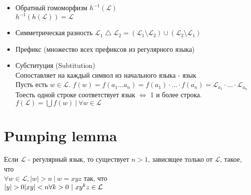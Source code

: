 \documentclass{article}
\begin{document}
\begin{itemize}
		\item Обратный гомоморфизм \(h^{-1}(\mathcal{L})\)\\
		\(h^{-1}(h(\mathcal{L})) = \mathcal{L}\)
		\item Симметрическая разность \(\mathcal{L}_1 \bigtriangleup \mathcal{L}_2 = (\mathcal{L}_1 \setminus \mathcal{L}_2) \cup (\mathcal{L}_2 \setminus \mathcal{L}_1)\)
		\item Префикс (множество всех префиксов из регулярного языка)
		\item Субституция (Subtitution)\\
		Сопоставляет на каждый символ из начального языка - язык\\
		Пусть есть $w \in \mathcal{L}$. $f(w) = f(a_1...a_n) = f(a_1) \cdot ... \cdot f(a_n) = \mathcal{L}_{a_1} \cdot ... \cdot \mathcal{L}_{a_n}$\\
		Тоесть одной строке соответствует язык $\iff$ 1 и более строка.\\
		\(f(\mathcal{L}) = \bigcup f(w) \ | \ \forall w \in \mathcal{L}\)
		
	\end{itemize}
	
	\section{Pumping lemma}
	Если $\mathcal{L}$ - регулярный язык, то существует $n > 1$, зависящее только от $\mathcal{L}$, такое, что \\ \(\forall w \in \mathcal{L}, |w| > n \ | \ w = xyz\) так, что \\
	\(
	|y| > 0\\
	|xy| < n\\
	\forall k > 0 \ | \ xy^kz \in \mathcal{L}
	\)
	
\end{document}
